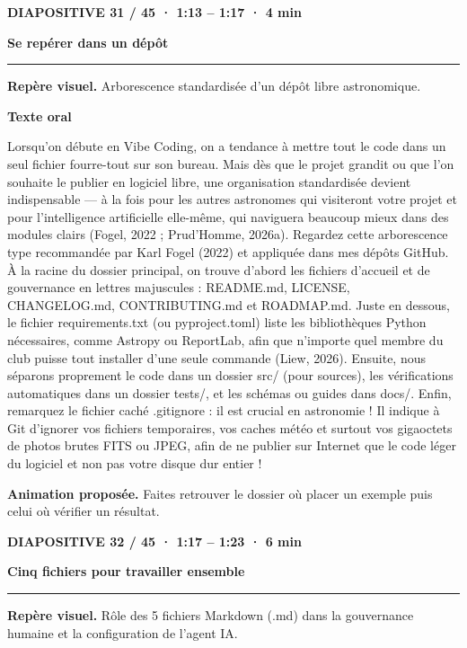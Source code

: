\documentclass[10pt,letterpaper]{article}
\newcommand{\repere}[1]{\textcolor{accent}{\bfseries #1}\par}
\begin{document}
\clearpage\repere{DIAPOSITIVE 31 / 45 · 1:13 – 1:17 · 4 min}

{\Large\bfseries Se repérer dans un dépôt\par}

\smallskip\hrule\smallskip

{\small\textbf{Repère visuel.} Arborescence standardisée d'un dépôt libre astronomique.\par}

\par\medskip\repere{Texte oral}

Lorsqu'on débute en Vibe Coding, on a tendance à mettre tout le code dans un seul fichier fourre-tout sur son bureau. Mais dès que le projet grandit ou que l'on souhaite le publier en logiciel libre, une organisation standardisée devient indispensable — à la fois pour les autres astronomes qui visiteront votre projet et pour l'intelligence artificielle elle-même, qui naviguera beaucoup mieux dans des modules clairs (Fogel, 2022 ; Prud'Homme, 2026a). Regardez cette arborescence type recommandée par Karl Fogel (2022) et appliquée dans mes dépôts GitHub. À la racine du dossier principal, on trouve d'abord les fichiers d'accueil et de gouvernance en lettres majuscules : README.md, LICENSE, CHANGELOG.md, CONTRIBUTING.md et ROADMAP.md. Juste en dessous, le fichier requirements.txt (ou pyproject.toml) liste les bibliothèques Python nécessaires, comme Astropy ou ReportLab, afin que n'importe quel membre du club puisse tout installer d'une seule commande (Liew, 2026). Ensuite, nous séparons proprement le code dans un dossier src/ (pour sources), les vérifications automatiques dans un dossier tests/, et les schémas ou guides dans docs/. Enfin, remarquez le fichier caché .gitignore : il est crucial en astronomie ! Il indique à Git d'ignorer vos fichiers temporaires, vos caches météo et surtout vos gigaoctets de photos brutes FITS ou JPEG, afin de ne publier sur Internet que le code léger du logiciel et non pas votre disque dur entier !\par

\smallskip\textbf{Animation proposée.} Faites retrouver le dossier où placer un exemple puis celui où vérifier un résultat.

\clearpage\repere{DIAPOSITIVE 32 / 45 · 1:17 – 1:23 · 6 min}

{\Large\bfseries Cinq fichiers pour travailler ensemble\par}

\smallskip\hrule\smallskip

{\small\textbf{Repère visuel.} Rôle des 5 fichiers Markdown (.md) dans la gouvernance humaine et la configuration de l'agent IA.\par}
\end{document}
